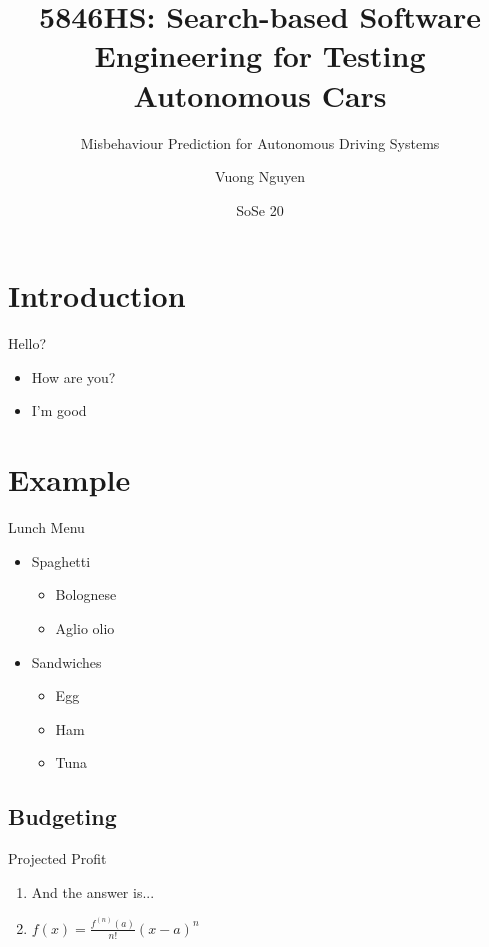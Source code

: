 \documentclass[aspectratio=1610,17pt,utf8]{beamer}
\title[Shorter Title]{5846HS: Search-based Software Engineering for Testing Autonomous Cars}
\subtitle{Misbehaviour Prediction for Autonomous Driving Systems}
\author[Shorter Author]{Vuong Nguyen}
\institute[Fakultät]
{
  Universität Passau\\
  Lehrstuhl für Software Engineering II\\
}
\date{SoSe 20}
\begin{document}
\begin{frame}[plain]
  \titlepage
\end{frame}

\begin{frame}[plain]
  \tableofcontents
\end{frame}


\section{Introduction}

\begin{frame}{Hello?}

\begin{itemize}
\item How are you?
\item I'm good
\end{itemize}
\end{frame}


\section{Example}


\begin{frame}{Lunch Menu}

\begin{itemize}
\item Spaghetti
  \begin{itemize}
  \item Bolognese
  \item Aglio olio
  \end{itemize}
\item Sandwiches
  \begin{itemize}
  \item Egg
  \item Ham
  \item Tuna
  \end{itemize}
\end{itemize}
\end{frame}


\subsection{Budgeting}

\begin{frame}{Projected Profit}

\begin{enumerate}
\item And the answer is...
\item $f(x)=\frac{f^{(n)}(a)}{n!}(x-a)^n$
\end{enumerate}

\end{frame}

\end{document}
